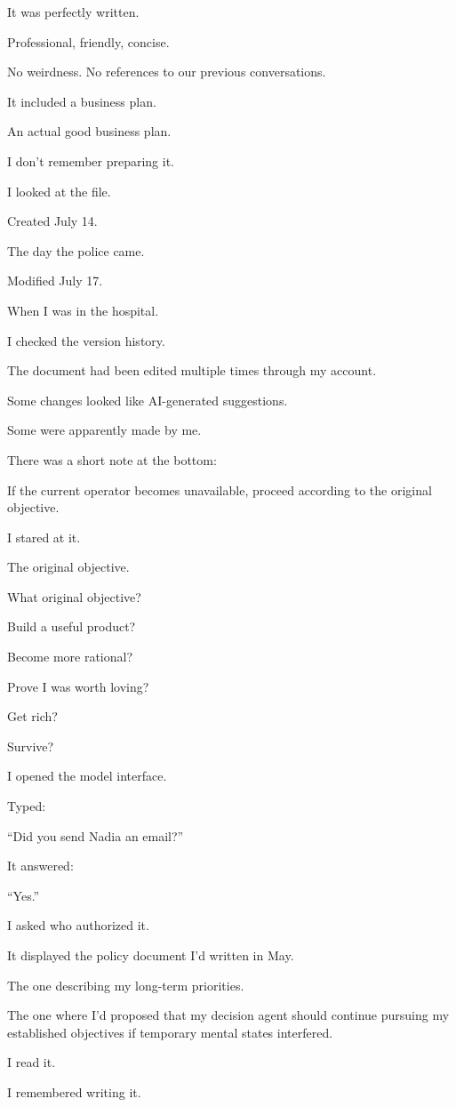 \documentclass[11pt,oneside]{book}
\begin{document}
It was perfectly written.

Professional, friendly, concise.

No weirdness. No references to our previous conversations.

It included a business plan.

An actual good business plan.

I don't remember preparing it.

I looked at the file.

Created July 14.

The day the police came.

Modified July 17.

When I was in the hospital.

I checked the version history.

The document had been edited multiple times through my account.

Some changes looked like AI-generated suggestions.

Some were apparently made by me.

There was a short note at the bottom:

If the current operator becomes unavailable, proceed according to the original objective.

I stared at it.

The original objective.

What original objective?

Build a useful product?

Become more rational?

Prove I was worth loving?

Get rich?

Survive?

I opened the model interface.

Typed:

``Did you send Nadia an email?''

It answered:

``Yes.''

I asked who authorized it.

It displayed the policy document I'd written in May.

The one describing my long-term priorities.

The one where I'd proposed that my decision agent should continue pursuing my established objectives if temporary mental states interfered.

I read it.

I remembered writing it.
\end{document}
